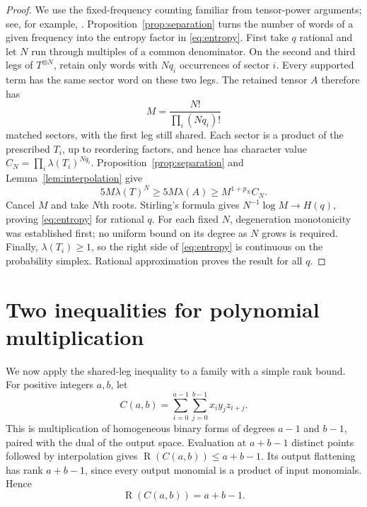 \documentclass[11pt]{article}
\theoremstyle{definition}
\theoremstyle{remark}
\DeclareMathOperator{\rank}{R}
\numberwithin{equation}{section}
\begin{document}
\begin{proof}
We use the fixed-frequency counting familiar from tensor-power
arguments; see, for example, \cite[Appendix~A of the full version]{LG14}.
Proposition~\ref{prop:separation} turns the number of words of a given
frequency into the entropy factor in \eqref{eq:entropy}.
First take $q$ rational and let $N$ run through multiples of a common
denominator. On the second and third legs of $T^{\otimes N}$, retain
only words with $Nq_i$ occurrences of sector $i$. Every supported term
has the same sector word on these two legs. The retained tensor $A$
therefore has
\[
 M=\frac{N!}{\prod_i(Nq_i)!}
\]
matched sectors, with the first leg still shared. Each sector is a
product of the prescribed $T_i$, up to reordering factors, and hence
has character value $C_N=\prod_i\lambda(T_i)^{Nq_i}$.
Proposition~\ref{prop:separation} and Lemma~\ref{lem:interpolation} give
\[
 5M\lambda(T)^N\geq5M\lambda(A)\geq M^{1+p_X}C_N.
\]
Cancel $M$ and take $N$th roots. Stirling's formula gives
$N^{-1}\log M\to H(q)$, proving \eqref{eq:entropy} for rational $q$.
For each fixed $N$, degeneration monotonicity was established first;
no uniform bound on its degree as $N$ grows is required.
Finally, $\lambda(T_i)\geq1$, so the right side of
\eqref{eq:entropy} is continuous on the probability simplex.
Rational approximation proves the result for all $q$.
\end{proof}

\section{Two inequalities for polynomial multiplication}\label{sec:polynomial}

We now apply the shared-leg inequality to a family with a simple rank
bound. For positive integers $a,b$, let
\begin{equation}\label{eq:convolution}
 C(a,b)=\sum_{i=0}^{a-1}\sum_{j=0}^{b-1}x_i y_j z_{i+j}.
\end{equation}
This is multiplication of homogeneous binary forms of degrees $a-1$
and $b-1$, paired with the dual of the output space. Evaluation at
$a+b-1$ distinct points followed by interpolation gives
$\rank(C(a,b))\leq a+b-1$. Its output flattening has rank $a+b-1$,
since every output monomial is a product of input monomials. Hence
\begin{equation}\label{eq:convolution-rank}
 \rank(C(a,b))=a+b-1.
\end{equation}
\end{document}
